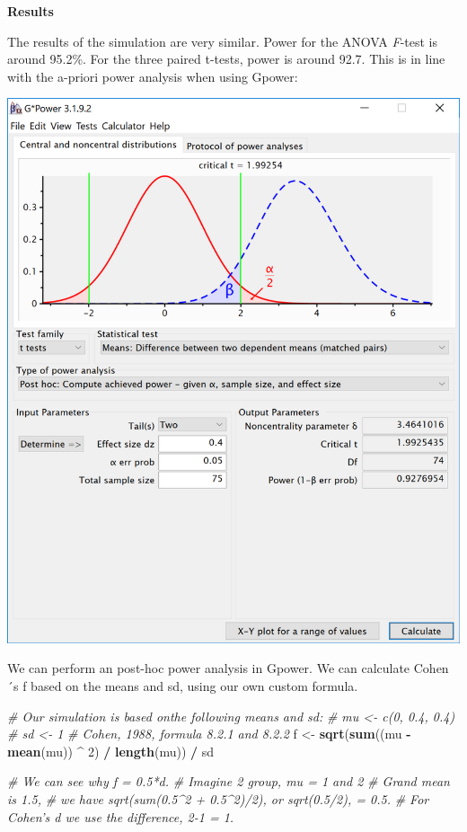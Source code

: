 \documentclass[]{book}
\newenvironment{Shaded}{\begin{snugshade}}{\end{snugshade}}
\newcommand{\CommentTok}[1]{\textcolor[rgb]{0.56,0.35,0.01}{\textit{#1}}}
\newcommand{\DecValTok}[1]{\textcolor[rgb]{0.00,0.00,0.81}{#1}}
\newcommand{\KeywordTok}[1]{\textcolor[rgb]{0.13,0.29,0.53}{\textbf{#1}}}
\newcommand{\NormalTok}[1]{#1}
\newcommand{\OperatorTok}[1]{\textcolor[rgb]{0.81,0.36,0.00}{\textbf{#1}}}
\newcommand{\StringTok}[1]{\textcolor[rgb]{0.31,0.60,0.02}{#1}}
\begin{document}
\textbf{Results}

The results of the simulation are very similar. Power for the ANOVA \emph{F}-test is around 95.2\%. For the three paired t-tests, power is around 92.7. This is in line with the a-priori power analysis when using Gpower:

\includegraphics{screenshots/gpower_2.png}

We can perform an post-hoc power analysis in Gpower. We can calculate Cohen´s f based on the means and sd, using our own custom formula.

\begin{Shaded}
\begin{Highlighting}[]
\CommentTok{# Our simulation is based onthe following means and sd:}
\CommentTok{# mu <- c(0, 0.4, 0.4)}
\CommentTok{# sd <- 1}
\CommentTok{# Cohen, 1988, formula 8.2.1 and 8.2.2}
\NormalTok{f <-}\StringTok{ }\KeywordTok{sqrt}\NormalTok{(}\KeywordTok{sum}\NormalTok{((mu }\OperatorTok{-}\StringTok{ }\KeywordTok{mean}\NormalTok{(mu)) }\OperatorTok{^}\StringTok{ }\DecValTok{2}\NormalTok{) }\OperatorTok{/}\StringTok{ }\KeywordTok{length}\NormalTok{(mu)) }\OperatorTok{/}\StringTok{ }\NormalTok{sd }

\CommentTok{# We can see why f = 0.5*d.}
\CommentTok{# Imagine 2 group, mu = 1 and 2}
\CommentTok{# Grand mean is 1.5, }
\CommentTok{# we have sqrt(sum(0.5^2 + 0.5^2)/2), or sqrt(0.5/2), = 0.5.}
\CommentTok{# For Cohen's d we use the difference, 2-1 = 1. }
\end{Highlighting}
\end{Shaded}
\end{document}
